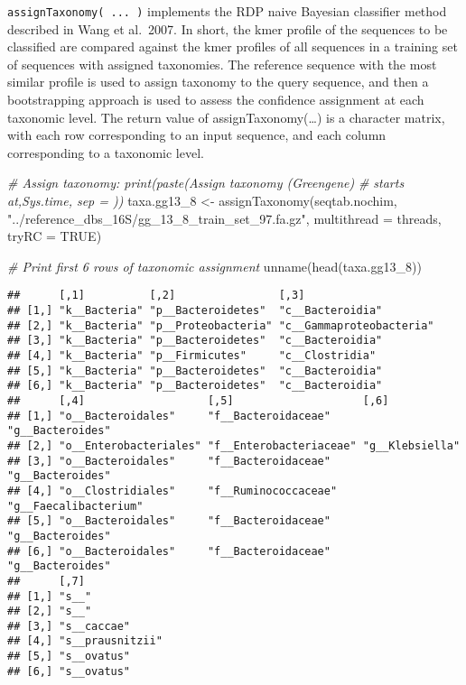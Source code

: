 \documentclass[
]{article}
\newenvironment{Shaded}{\begin{snugshade}}{\end{snugshade}}
\newcommand{\AttributeTok}[1]{\textcolor[rgb]{0.77,0.63,0.00}{#1}}
\newcommand{\CommentTok}[1]{\textcolor[rgb]{0.56,0.35,0.01}{\textit{#1}}}
\newcommand{\ConstantTok}[1]{\textcolor[rgb]{0.00,0.00,0.00}{#1}}
\newcommand{\FunctionTok}[1]{\textcolor[rgb]{0.00,0.00,0.00}{#1}}
\newcommand{\NormalTok}[1]{#1}
\newcommand{\OtherTok}[1]{\textcolor[rgb]{0.56,0.35,0.01}{#1}}
\newcommand{\StringTok}[1]{\textcolor[rgb]{0.31,0.60,0.02}{#1}}
\begin{document}
\texttt{assignTaxonomy(\ ...\ )} implements the RDP naive Bayesian
classifier method described in Wang et al.~2007. In short, the kmer
profile of the sequences to be classified are compared against the kmer
profiles of all sequences in a training set of sequences with assigned
taxonomies. The reference sequence with the most similar profile is used
to assign taxonomy to the query sequence, and then a bootstrapping
approach is used to assess the confidence assignment at each taxonomic
level. The return value of assignTaxonomy(\ldots) is a character matrix,
with each row corresponding to an input sequence, and each column
corresponding to a taxonomic level.

\begin{Shaded}
\begin{Highlighting}[]
\CommentTok{\# Assign taxonomy: print(paste(\textquotesingle{}Assign taxonomy (Greengene)}
\CommentTok{\# starts at\textquotesingle{},Sys.time, sep = \textquotesingle{} \textquotesingle{}))}
\NormalTok{taxa.gg13\_8 }\OtherTok{\textless{}{-}} \FunctionTok{assignTaxonomy}\NormalTok{(seqtab.nochim, }\StringTok{"../reference\_dbs\_16S/gg\_13\_8\_train\_set\_97.fa.gz"}\NormalTok{, }
    \AttributeTok{multithread =}\NormalTok{ threads, }\AttributeTok{tryRC =} \ConstantTok{TRUE}\NormalTok{)}

\CommentTok{\# Print first 6 rows of taxonomic assignment}
\FunctionTok{unname}\NormalTok{(}\FunctionTok{head}\NormalTok{(taxa.gg13\_8))}
\end{Highlighting}
\end{Shaded}

\begin{verbatim}
##      [,1]          [,2]                [,3]                    
## [1,] "k__Bacteria" "p__Bacteroidetes"  "c__Bacteroidia"        
## [2,] "k__Bacteria" "p__Proteobacteria" "c__Gammaproteobacteria"
## [3,] "k__Bacteria" "p__Bacteroidetes"  "c__Bacteroidia"        
## [4,] "k__Bacteria" "p__Firmicutes"     "c__Clostridia"         
## [5,] "k__Bacteria" "p__Bacteroidetes"  "c__Bacteroidia"        
## [6,] "k__Bacteria" "p__Bacteroidetes"  "c__Bacteroidia"        
##      [,4]                   [,5]                    [,6]                 
## [1,] "o__Bacteroidales"     "f__Bacteroidaceae"     "g__Bacteroides"     
## [2,] "o__Enterobacteriales" "f__Enterobacteriaceae" "g__Klebsiella"      
## [3,] "o__Bacteroidales"     "f__Bacteroidaceae"     "g__Bacteroides"     
## [4,] "o__Clostridiales"     "f__Ruminococcaceae"    "g__Faecalibacterium"
## [5,] "o__Bacteroidales"     "f__Bacteroidaceae"     "g__Bacteroides"     
## [6,] "o__Bacteroidales"     "f__Bacteroidaceae"     "g__Bacteroides"     
##      [,7]            
## [1,] "s__"           
## [2,] "s__"           
## [3,] "s__caccae"     
## [4,] "s__prausnitzii"
## [5,] "s__ovatus"     
## [6,] "s__ovatus"
\end{verbatim}
\end{document}
